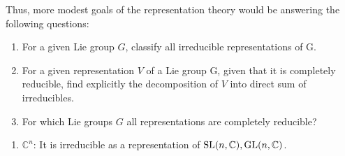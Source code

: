 \documentclass{report}
\begin{document}
Thus, more modest goals of the representation theory would be answering
the following questions:
\begin{enumerate}[label = (\roman*)]
    \item For a given Lie group $G$, classify all irreducible representations of G.
    \item For a given representation $V$ of a Lie group G, given that it is completely reducible, ﬁnd explicitly the decomposition of $V$ into direct sum of irreducibles.
    \item For which Lie groups $G$ all representations are completely reducible?
\end{enumerate}

\begin{example}
    \begin{enumerate}[label = (\roman*)]
        \item $\mathbb C^n$: It is irreducible as a representation of $\operatorname{{\mathrm{SL}}}(n, \mathbb C), \operatorname{{\mathrm{GL}}}(n, \mathbb C)$.
    \end{enumerate}
\end{example}
\end{document}
